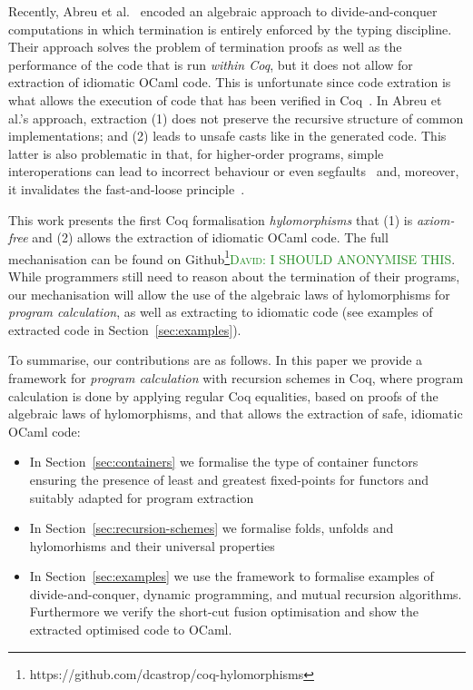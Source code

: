 \documentclass{llncs}
\newcommand{\dcas}[1]{\textcolor{ForestGreen}{\textsc{David}: #1}}
\begin{document}
Recently, Abreu et al.~\cite{AbreuDHJMS23} encoded an algebraic approach to
divide-and-conquer computations in which termination is entirely enforced by the
typing discipline. Their approach solves the problem of termination proofs as
well as the performance of the code that is run \emph{within Coq}, but it does
not allow for extraction of idiomatic OCaml code. This is unfortunate since code
extration is what allows the execution of code that has been verified in
Coq~\cite{OnoHTNH11,Larchey-Wendling23,MiculanP12,Sakaguchi20}.  In Abreu et
al.'s approach, extraction (1) does not preserve the recursive structure of
common implementations; and (2) leads to unsafe casts like  in
the generated code. This latter is also problematic in that, for higher-order
programs, simple interoperations can lead to incorrect behaviour or even
segfaults~\cite{forster:hal-04329663} and, moreover, it invalidates the
fast-and-loose principle~\cite{DanielssonHJG06}.

This work presents the first Coq formalisation \emph{hylomorphisms} that (1) is
\emph{axiom-free} and (2) allows the extraction of idiomatic OCaml code. The
full mechanisation can be found on
Github\footnote{https://github.com/dcastrop/coq-hylomorphisms}\dcas{I SHOULD
ANONYMISE THIS}. While programmers still need to reason about the termination of
their programs, our mechanisation will allow the use of the algebraic laws of
hylomorphisms for \emph{program calculation}, as well as extracting to idiomatic
code (see examples of extracted code in Section~\ref{sec:examples}).

To summarise, our contributions are as follows. In this paper we provide a
framework for \emph{program calculation} with recursion schemes in Coq, where
program calculation is done by applying regular Coq equalities, based on  proofs
of the algebraic laws of hylomorphisms, and that allows the extraction of safe,
idiomatic OCaml code:
\begin{itemize}
  \item In Section~\ref{sec:containers} we formalise the type of container
functors ensuring the presence of least and greatest fixed-points for functors
and suitably adapted for program extraction
  \item In Section~\ref{sec:recursion-schemes} we formalise folds, unfolds and
hylomorhisms and their universal properties
  \item In Section~\ref{sec:examples} we use the framework to formalise examples
of divide-and-conquer, dynamic programming, and mutual recursion algorithms.
Furthermore we verify the short-cut fusion optimisation and show the extracted
optimised code to OCaml.
\end{itemize}
\end{document}
